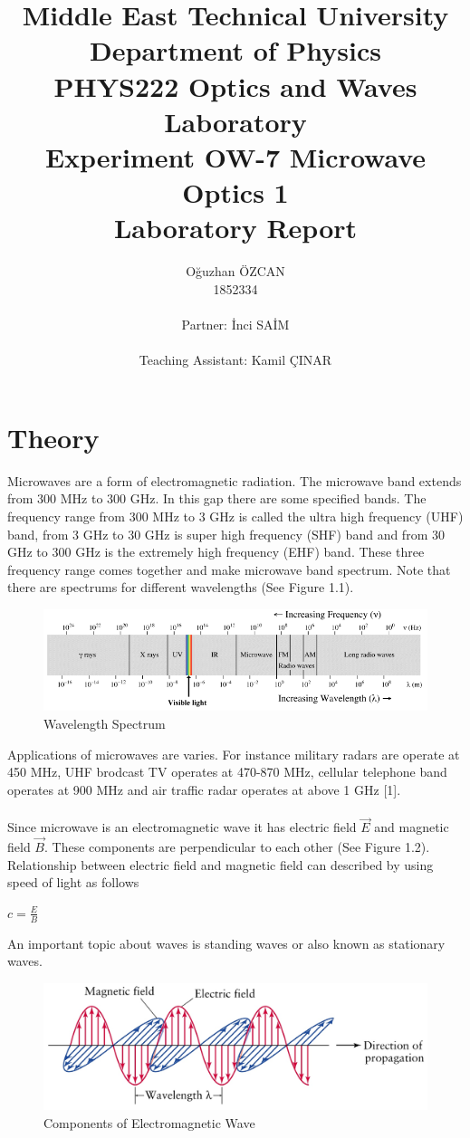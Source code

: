 \documentclass[a4paper,12pt]{report}
\title{Middle East Technical University\\Department of Physics\\PHYS222 Optics and Waves Laboratory\\\textbf{Experiment OW-7 Microwave Optics 1\\Laboratory Report}}
\author{Oğuzhan ÖZCAN\\1852334\\\\Partner: İnci SAİM\\\\Teaching Assistant: Kamil ÇINAR}
\begin{document}
\maketitle
\tableofcontents
\listoffigures
\listoftables
\chapter{Theory}
Microwaves are a form of electromagnetic radiation. The microwave band extends from 300 MHz to 300 GHz. In this gap there are some specified bands. The frequency range from 300 MHz to 3 GHz is called the ultra high frequency (UHF) band, from 3 GHz to 30 GHz is super high frequency (SHF) band and from 30 GHz to 300 GHz is the extremely high frequency (EHF) band. These three frequency range comes together and make microwave band spectrum. Note that there are spectrums for different wavelengths (See Figure 1.1).
\begin{figure}[h]
\centering
\includegraphics[width=1.0\linewidth, height=0.22\textheight]{spectrum}
\caption{Wavelength Spectrum}
\label{fig:spectrum}
\end{figure}
Applications of microwaves are varies. For instance military radars are operate at 450 MHz, UHF brodcast TV operates at 470-870 MHz, cellular telephone band operates at 900 MHz and air traffic radar operates at above 1 GHz [1].\\\\
Since microwave is an electromagnetic wave it has electric field $\vec{E}$ and magnetic field $\vec{B}$. These components are perpendicular to each other (See Figure 1.2). Relationship between electric field and magnetic field can described by using speed of light as follows
\begin{center}
	{\large $c=\frac{E}{B}$}
\end{center}
An important topic about waves is standing waves or also known as stationary waves.
\begin{figure}[h]
\centering
\includegraphics[width=1.0\linewidth, height=0.23\textheight]{em}
\caption{Components of Electromagnetic Wave}
\label{fig:em}
\end{figure}
\end{document}
